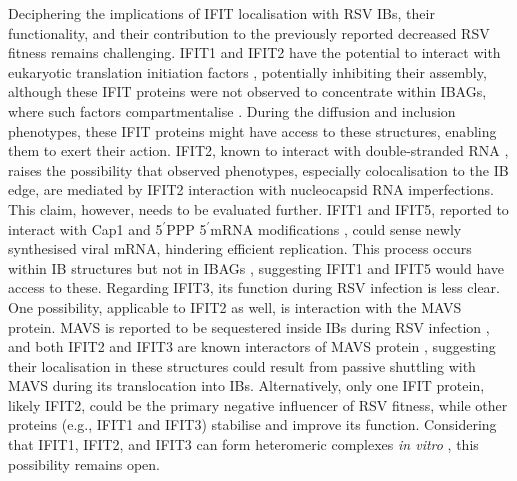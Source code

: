 Deciphering the implications of IFIT localisation with RSV IBs, their functionality, and their contribution to the previously reported decreased RSV fitness remains challenging. IFIT1 and IFIT2 have the potential to interact with eukaryotic translation initiation factors \cite{Diamond2014IFIT1:Translation, Guo2000CharacterizationVirus}, potentially inhibiting their assembly, although these IFIT proteins were not observed to concentrate within IBAGs, where such factors compartmentalise \cite{Jobe2023ViralCondensates}. During the diffusion and inclusion phenotypes, these IFIT proteins might have access to these structures, enabling them to exert their action. IFIT2, known to interact with double-stranded RNA \cite{Yang2012CrystalMechanisms}, raises the possibility that observed phenotypes, especially colocalisation to the IB edge, are mediated by IFIT2 interaction with nucleocapsid RNA imperfections. This claim, however, needs to be evaluated further. IFIT1 and IFIT5, reported to interact with Cap1 and 5$^{\prime}$PPP 5$^{\prime}$mRNA modifications \cite{Kumar2014InhibitionMRNAs}, could sense newly synthesised viral mRNA, hindering efficient replication. This process occurs within IB structures but not in IBAGs \cite{Rincheval2017FunctionalVirus}, suggesting IFIT1 and IFIT5 would have access to these. Regarding IFIT3, its function during RSV infection is less clear. One possibility, applicable to IFIT2 as well, is interaction with the MAVS protein. MAVS is reported to be sequestered inside IBs during RSV infection \cite{Lifland2012HumanMAVS}, and both IFIT2 and IFIT3 are known interactors of MAVS protein \cite{Chen2017InhibitionApoptosis, Diamond2013TheProteins, Liu2011IFN-InducedTBK1}, suggesting their localisation in these structures could result from passive shuttling with MAVS during its translocation into IBs. Alternatively, only one IFIT protein, likely IFIT2, could be the primary negative influencer of RSV fitness, while other proteins (e.g., IFIT1 and IFIT3) stabilise and improve its function. Considering that IFIT1, IFIT2, and IFIT3 can form heteromeric complexes \textit{in vitro} \cite{Mears2018BetterResponse}, this possibility remains open.

